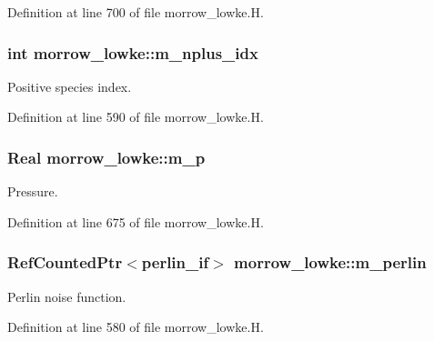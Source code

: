 Definition at line 700 of file morrow\+\_\+lowke.\+H.

\subsubsection[{\texorpdfstring{m\+\_\+nplus\+\_\+idx}{m_nplus_idx}}]{\setlength{\rightskip}{0pt plus 5cm}int morrow\+\_\+lowke\+::m\+\_\+nplus\+\_\+idx}\hypertarget{classmorrow__lowke_a47d6f6f847f9c547b7ce88fabd3b6e03}{}\label{classmorrow__lowke_a47d6f6f847f9c547b7ce88fabd3b6e03}


Positive species index. 



Definition at line 590 of file morrow\+\_\+lowke.\+H.

\subsubsection[{\texorpdfstring{m\+\_\+p}{m_p}}]{\setlength{\rightskip}{0pt plus 5cm}Real morrow\+\_\+lowke\+::m\+\_\+p}\hypertarget{classmorrow__lowke_a70a4c695e003ff81a161a81118f32fd6}{}\label{classmorrow__lowke_a70a4c695e003ff81a161a81118f32fd6}


Pressure. 



Definition at line 675 of file morrow\+\_\+lowke.\+H.

\subsubsection[{\texorpdfstring{m\+\_\+perlin}{m_perlin}}]{\setlength{\rightskip}{0pt plus 5cm}Ref\+Counted\+Ptr$<${\bf perlin\+\_\+if}$>$ morrow\+\_\+lowke\+::m\+\_\+perlin}\hypertarget{classmorrow__lowke_a50cd9e910b47a7cc00e6a9d37e2657fb}{}\label{classmorrow__lowke_a50cd9e910b47a7cc00e6a9d37e2657fb}


Perlin noise function. 



Definition at line 580 of file morrow\+\_\+lowke.\+H.

